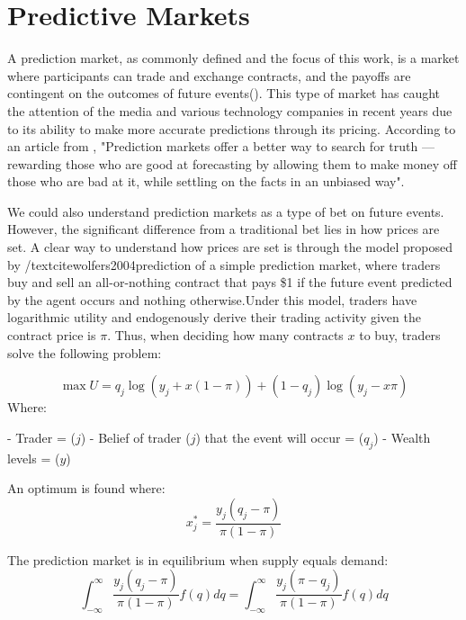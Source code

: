 \section{Predictive Markets}
\label{sec:predictive_markets}

A prediction market, as commonly defined and the focus of this work, is a market where participants can trade and exchange contracts, and the payoffs are contingent on the outcomes of future events(\citeauthor{wolfers2004prediction}). This type of market has caught the attention of the media and various technology companies in recent years due to its ability to make more accurate predictions through its pricing. According to an article from \textcite{Roose_2023}, "Prediction markets offer a better way to search for truth — rewarding those who are good at forecasting by allowing them to make money off those who are bad at it, while settling on the facts in an unbiased way".

We could also understand prediction markets as a type of bet on future events. However, the significant difference from a traditional bet lies in how prices are set. A clear way to understand how prices are set is through the model proposed by  /textcite{wolfers2004prediction}  of a simple prediction market, where traders buy and sell an all-or-nothing contract that pays  \$1 if the future event predicted by the agent occurs and nothing otherwise.Under this model, traders have logarithmic utility and endogenously derive their trading activity given the contract price is \( \pi \). Thus, when deciding how many contracts \( x \) to buy, traders solve the following problem:

\begin{equation}
    \max U = q_j \log(y_j + x(1 - \pi)) + (1 - q_j) \log(y_j - x\pi)
\end{equation}
Where:

- Trader = (\( j \))
- Belief of trader (\( j \)) that the event will occur = (\( q_j \))
- Wealth levels = (\( y \))

An optimum is found where:
\begin{equation}
    x_j^* = \frac{y_j(q_j - \pi)}{\pi(1 - \pi)}
\end{equation}

The prediction market is in equilibrium when supply equals demand:
\begin{equation}
    \int_{-\infty}^{\infty}\frac{y_j(q_j - \pi)}{\pi(1 - \pi)}f(q)dq = \int_{-\infty}^{\infty}\frac{y_j(\pi -q_j)}{\pi(1 - \pi)}f(q)dq
\end{equation}

